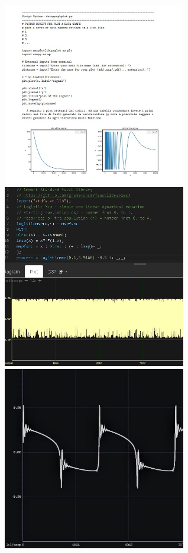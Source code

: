 \documentclass[12pt,landscape]{article}
\begin{document}
{\begin{center}
\begin{figure}[!htb]
  \includegraphics[width=8cm]{skills1.jpg}

\endminipage\hfill
{}
  \includegraphics[width=8cm]{skills2.jpg}

\endminipage\hfill
{}%
  \includegraphics[width=8cm]{osc1.jpg}


\end{figure}
\end{center}}
\end{document}
